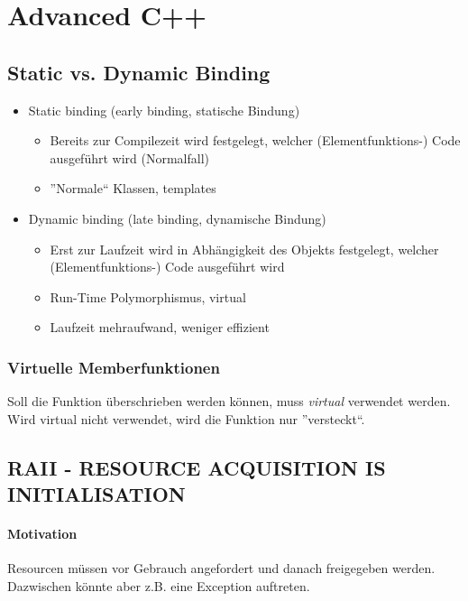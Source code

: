 \section{Advanced C++}

\subsection{Static vs. Dynamic Binding}
\begin{itemize}
	\item Static binding (early binding, statische Bindung)
		\begin{itemize}
			\item Bereits zur Compilezeit wird festgelegt, welcher (Elementfunktions-) Code
				ausgeführt wird (Normalfall)
			\item ''Normale`` Klassen, templates
		\end{itemize}
	\item Dynamic binding (late binding, dynamische Bindung)
		\begin{itemize}
			\item Erst zur Laufzeit wird in Abhängigkeit des Objekts festgelegt, welcher
				(Elementfunktions-) Code ausgeführt wird
			\item Run-Time Polymorphismus, virtual
			\item Laufzeit mehraufwand, weniger effizient
		\end{itemize}
\end{itemize}

\subsubsection{Virtuelle Memberfunktionen}

Soll die Funktion überschrieben werden können, muss \emph{virtual} verwendet werden.
Wird virtual nicht verwendet, wird die Funktion nur ''versteckt``.



\subsection[RAII]{RAII - RESOURCE ACQUISITION IS INITIALISATION}

\paragraph{Motivation}
Resourcen müssen vor Gebrauch angefordert und danach freigegeben werden.
Dazwischen könnte aber z.B. eine Exception auftreten.

